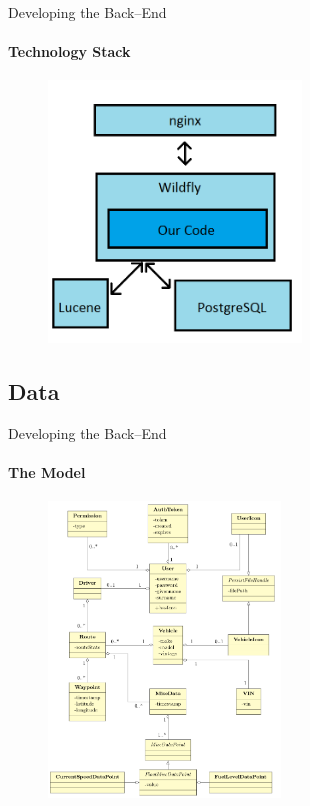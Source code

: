         \begin{frame}[t]{Developing the Back--End}\framesubtitle{Technology Stack}
             \begin{figure}[htb]
                \centering
                \includegraphics[width=0.6\textwidth]{dankarkitektur.png}
            \end{figure}
        \end{frame}

    \subsection{Data}
        \begin{frame}[t]{Developing the Back--End}\framesubtitle{The Model}
            \begin{figure}[htb]
                    \centering
                    \includegraphics[width=0.55\textwidth]{class_diagram.png}
                \end{figure}
        \end{frame}

